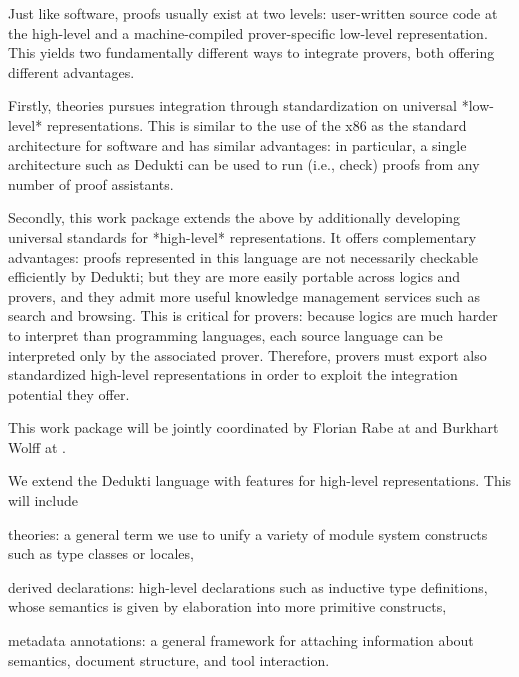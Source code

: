 \begin{workpackage}[id=structuring,wphases=0-48,type=RTD,
  short=Structured Theories and Metadata,%
  title=Structured Theories and Metadata,
  lead=Fau,
  BolRM=18,
  FauRM=48,
  SacRM=48]
  

\begin{wpobjectives}
Just like software, proofs usually exist at two levels: user-written source code at the high-level and a machine-compiled prover-specific low-level representation.
This yields two fundamentally different ways to integrate provers, both offering different advantages.

Firstly, theories pursues integration through standardization on universal *low-level* representations.
This is similar to the use of the x86 as the standard architecture for software and has similar advantages: in particular, a single architecture such as Dedukti can be used to run (i.e., check) proofs from any number of proof assistants.

Secondly, this work package extends the above by additionally developing universal standards for *high-level* representations.
It offers complementary advantages: proofs represented in this language are not necessarily checkable efficiently by Dedukti; but they are more easily portable across logics and provers, and they admit more useful knowledge management services such as search and browsing.
This is critical for provers: because logics are much harder to interpret than programming languages, each source language can be interpreted only by the associated prover.
Therefore, provers must export also standardized high-level representations in order to exploit the integration potential they offer.

This work package will be jointly coordinated by Florian Rabe at  and Burkhart Wolff at .
\end{wpobjectives}


\begin{wpdescription}
We extend the Dedukti language with features for high-level representations.
This will include
\begin{compactitem}
\item theories: a general term we use to unify a variety of module system constructs such as type classes or locales,
\item derived declarations: high-level declarations such as inductive type definitions, whose semantics is given by elaboration into more primitive constructs,
\item metadata annotations: a general framework for attaching information about semantics, document structure, and tool interaction.
\end{compactitem}


\end{wpdescription}
\end{workpackage}
